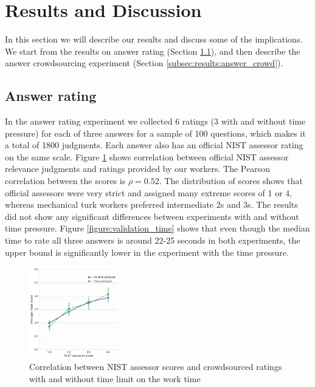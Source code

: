 \documentclass[11pt,letterpaper]{article}
\begin{document}
\section{Results and Discussion}
\label{sec:results}

In this section we will describe our results and discuss some of the implications.
We start from the results on answer rating (Section \ref{subsec:results:answer_rating}), and then describe the answer crowdsourcing experiment (Section \ref{subsec:results:answer_crowd}).

\subsection{Answer rating}
\label{subsec:results:answer_rating}

In the answer rating experiment we collected 6 ratings (3 with and without time pressure) for each of three answers for a sample of 100 questions, which makes it a total of 1800 judgments.
Each answer also has an official NIST assessor rating on the same scale.
Figure \ref{figure:score_correlation} shows correlation between official NIST assessor relevance judgments and ratings provided by our workers.
The Pearson correlation between the scores is $\rho=0.52$.
The distribution of scores shows that official assessors were very strict and assigned many extreme scores of 1 or 4, whereas mechanical turk workers preferred intermediate 2s and 3s.
The results did not show any significant differences between experiments with and without time pressure.
Figure \ref{figure:validation_time} shows that even though the median time to rate all three answers is around 22-25 seconds in both experiments, the upper bound is significantly lower in the experiment with the time pressure.

\begin{figure}[t!]
	\centering
	\includegraphics[width=0.35\textwidth]{img/score_correlation}
	\caption{Correlation between NIST assessor scores and crowdsourced ratings with and without time limit on the work time}
	\label{figure:score_correlation}
\end{figure}
\end{document}
